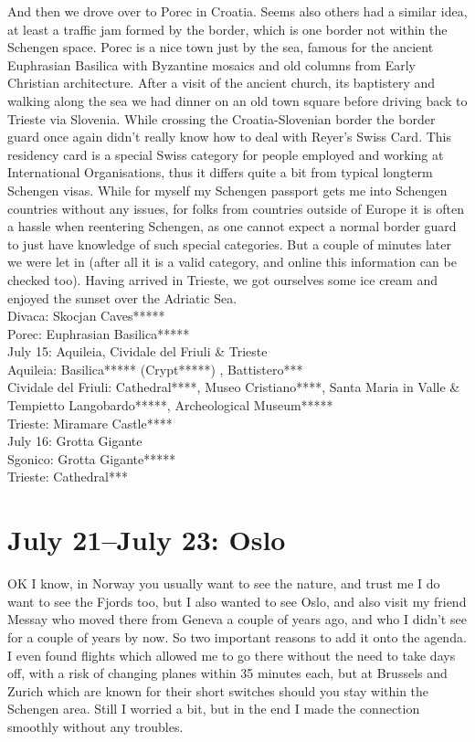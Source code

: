 And then we drove over to Porec in Croatia. Seems also others had a similar idea, at least a traffic jam formed by the border, which is one border not within the Schengen space. Porec is a nice town just by the sea, famous for the ancient Euphrasian Basilica with Byzantine mosaics and old columns from Early Christian architecture. After a visit of the ancient church, its baptistery and walking along the sea we had dinner on an old town square before driving back to Trieste via Slovenia. While crossing the Croatia-Slovenian border the border guard once again didn't really know how to deal with Reyer's Swiss Card. This residency card is a special Swiss category for people employed and working at International Organisations, thus it differs quite a bit from typical longterm Schengen visas. While for myself my Schengen passport gets me into Schengen countries without any issues, for folks from countries outside of Europe it is often a hassle when reentering Schengen, as one cannot expect a normal border guard to just have knowledge of such special categories. But a couple of minutes later we were let in (after all it is a valid category, and online this information can be checked too). Having arrived in Trieste, we got ourselves some ice cream and enjoyed the sunset over the Adriatic Sea.\\

Divaca: Skocjan Caves*****\\
Porec: Euphrasian Basilica*****\\

July 15: Aquileia, Cividale del Friuli \& Trieste\\
Aquileia: Basilica***** (Crypt*****) , Battistero***\\
Cividale del Friuli: Cathedral****, Museo Cristiano****, Santa Maria in Valle \& Tempietto Langobardo*****, Archeological Museum*****\\
Trieste: Miramare Castle****\\

July 16: Grotta Gigante\\
Sgonico: Grotta Gigante*****\\
Trieste: Cathedral***

\section{July 21--July 23: Oslo}
\label{Oslo2017}

OK I know, in Norway you usually want to see the nature, and trust me I do want to see the Fjords too, but I also wanted to see Oslo, and also visit my friend Messay who moved there from Geneva a couple of years ago, and who I didn't see for a couple of years by now. So two important reasons to add it onto the agenda. I even found flights which allowed me to go there without the need to take days off, with a risk of changing planes within 35 minutes each, but at Brussels and Zurich which are known for their short switches should you stay within the Schengen area. Still I worried a bit, but in the end I made the connection smoothly without any troubles.\\

